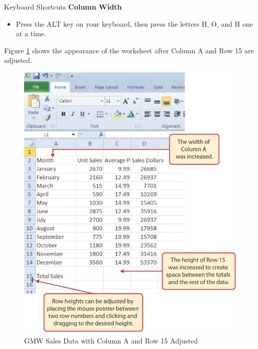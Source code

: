 \begin{center}
	\begin{shtcutbox}{Keyboard Shortcuts}
		\textbf{Column Width}
		\\
		\begin{itemize}
			\setlength{\itemsep}{0pt}
			\setlength{\parskip}{0pt}
			\setlength{\parsep}{0pt}
			
			\item Press the ALT key on your keyboard, then press the letters H, O, and H one at a time.
			
		\end{itemize}
	\end{shtcutbox}
\end{center}

Figure \ref{01:fig25} shows the appearance of the worksheet after Column A and Row 15 are adjusted.

\begin{figure}[H]
	\centering
	\includegraphics[width=\maxwidth{.95\linewidth}]{gfx/ch01_fig25}
	\caption{GMW Sales Data with Column A and Row 15 Adjusted}
	\label{01:fig25}
\end{figure}

